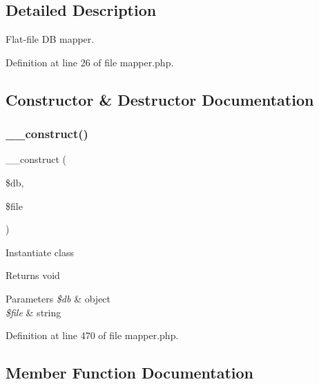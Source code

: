 \subsection{Detailed Description}
Flat-\/file DB mapper. 

Definition at line 26 of file mapper.\+php.



\subsection{Constructor \& Destructor Documentation}
\hypertarget{class_d_b_1_1_jig_1_1_mapper_a19fc308235f36411d08e0c019cddc0ad}{}\label{class_d_b_1_1_jig_1_1_mapper_a19fc308235f36411d08e0c019cddc0ad} 
\subsubsection{\texorpdfstring{\+\_\+\+\_\+construct()}{\_\_construct()}}
{\footnotesize\ttfamily \+\_\+\+\_\+construct (\begin{DoxyParamCaption}\item[{\textbackslash{}\hyperlink{class_d_b_1_1_jig}{D\+B\textbackslash{}\+Jig}}]{\$db,  }\item[{}]{\$file }\end{DoxyParamCaption})}

Instantiate class \begin{DoxyReturn}{Returns}
void 
\end{DoxyReturn}

\begin{DoxyParams}{Parameters}
{\em \$db} & object \\
\hline
{\em \$file} & string \\
\hline
\end{DoxyParams}


Definition at line 470 of file mapper.\+php.



\subsection{Member Function Documentation}
\hypertarget{class_d_b_1_1_jig_1_1_mapper_aa33294a722f17e6e4946223bb73f13ab}{}\label{class_d_b_1_1_jig_1_1_mapper_aa33294a722f17e6e4946223bb73f13ab} 
